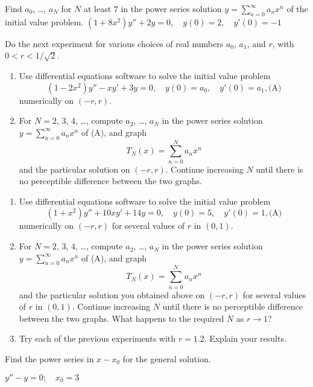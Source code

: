 \documentclass{ximera}
\begin{document}
\begin{problem}\label{exer:7.2.13}  Find $a_0$, \dots, $a_N$ for $N$ at least $7$ in the power series solution $y=\sum_{n=0}^\infty a_nx^n$
of the initial value problem.
$(1+8x^2)y''+2y=0,\quad y(0)=2,\quad
y'(0)=-1$
\end{problem}

\begin{problem}\label{exer:7.2.14}   
Do the next experiment for various choices of real numbers  $a_0$, $a_1$, and $r$, with $0<r<1/\sqrt2$.
\begin{enumerate}
\item %
Use differential equations software  to solve the initial
value problem
$$
(1-2x^2)y''-xy'+3y=0,\quad y(0)=a_0,\quad y'(0)=a_1,
\text{(A)}
$$
numerically on $(-r,r)$.
\item %
For $N=2$, $3$, $4$, \dots, compute $a_2$, \dots, $a_N$ in the power series
solution
$y=\sum_{n=0}^\infty a_nx^n$ of (A), and graph
$$
T_N(x)=\sum_{n=0}^N a_nx^n
$$
and the particular solution on $(-r,r)$.
Continue increasing $N$ until there is no perceptible
difference between the two graphs.
\end{enumerate}
\end{problem}

\begin{problem}\label{exer:7.2.15}    
\begin{enumerate}
\item %
Use differential equations software  to solve the initial value problem
$$
(1+x^2)y''+10xy'+14y=0,\quad y(0)=5,\quad y'(0)=1,
\text{(A)}
$$
numerically on $(-r,r)$ for several values of $r$ in $(0,1)$.
\item %
For $N=2$, $3$, $4$, \dots, compute $a_2$, \dots, $a_N$ in the power series
solution
$y=\sum_{n=0}^\infty a_nx^n$ of (A), and
graph
$$
T_N(x)=\sum_{n=0}^N a_nx^n
$$
and the particular solution you obtained above on $(-r,r)$ for several values of $r$ in $(0,1)$.
Continue increasing $N$ until there is no perceptible
difference between the two graphs. What happens to the required $N$
as $r\to1$?
\item %
Try each of the previous experiments with $r=1.2$. Explain your results.
\end{enumerate}
\end{problem}

\begin{problem}\label{exer:7.2.16}
Find the power series in $x-x_0$
for the general solution.

$y''-y=0;\quad   x_0=3$
\end{problem}
\end{document}

